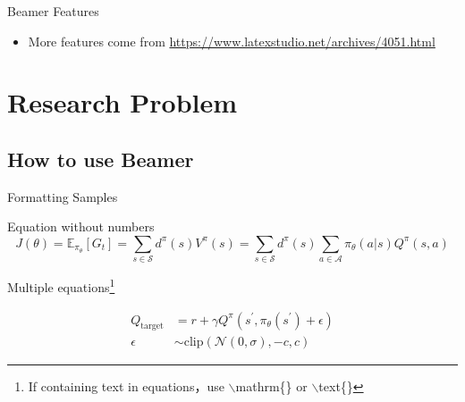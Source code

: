 \documentclass{beamer}
\begin{document}
\begin{frame}{Beamer Features}
    \begin{itemize}
        \item More features come from  \url{https://www.latexstudio.net/archives/4051.html}
    \end{itemize}
\end{frame}

\section{Research Problem}

\subsection{}



\subsection{How to use Beamer}

\begin{frame}{Formatting Samples}
    \begin{exampleblock}{Equation without numbers} 
        \begin{equation*}
            J(\theta) = \mathbb{E}_{\pi_\theta}[G_t] = \sum_{s\in\mathcal{S}} d^\pi (s)V^\pi(s)=\sum_{s\in\mathcal{S}} d^\pi(s)\sum_{a\in\mathcal{A}}\pi_\theta(a|s)Q^\pi(s,a)
        \end{equation*}
    \end{exampleblock}
    \begin{exampleblock}{Multiple equations\footnote{If containing text in equations，use $\backslash$mathrm\{\} or $\backslash$text\{\}}}
       
        \begin{align}
            Q_\mathrm{target}&=r+\gamma Q^\pi(s^\prime, \pi_\theta(s^\prime)+\epsilon)\\
            \epsilon&\sim\mathrm{clip}(\mathcal{N}(0, \sigma), -c, c)\nonumber
        \end{align}
    \end{exampleblock}
\end{frame}
\end{document}

